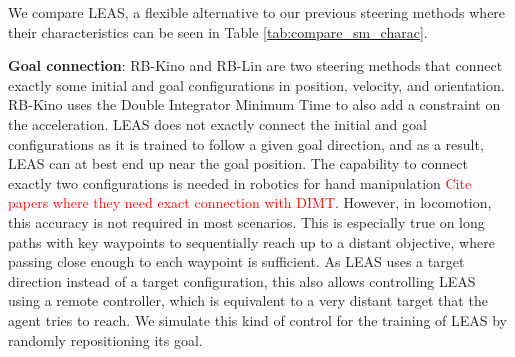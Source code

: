 We compare LEAS, a flexible alternative to our previous steering methods where their characteristics can be seen in Table \ref{tab:compare_sm_charac}.

\noindent \textbf{Goal connection}:
RB-Kino \cite{kinodynamic-sm} and RB-Lin \cite{AcyclicCP} are two steering methods that connect exactly some initial and goal configurations in position, velocity, and orientation. 
RB-Kino uses the Double Integrator Minimum Time \cite{DIMT_kino_planning_manipulator} to also add a constraint on the acceleration.
LEAS does not exactly connect the initial and goal configurations as it is trained to follow a given goal direction, and as a result, LEAS can at best end up near the goal position.
The capability to connect exactly two configurations is needed in robotics for hand manipulation \textcolor{red}{Cite papers where they need exact connection with DIMT}. However, in locomotion, this accuracy is not required in most scenarios.
This is especially true on long paths with key waypoints to sequentially reach up to a distant objective, where passing close enough to each waypoint is sufficient.
As LEAS uses a target direction instead of a target configuration, this also allows controlling LEAS using a remote controller, which is equivalent to a very distant target that the agent tries to reach. We simulate this kind of control for the training of LEAS by randomly repositioning its goal.


